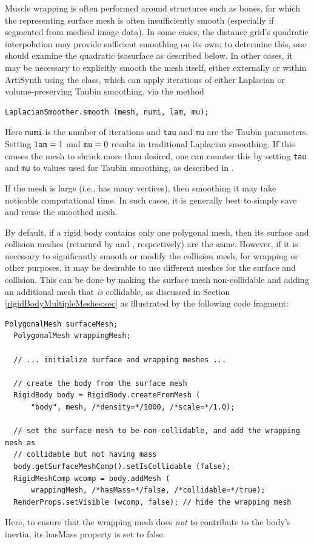 Muscle wrapping is often performed around structures such as bones,
for which the representing surface mesh is often insufficiently smooth
(especially if segmented from medical image data).  In some cases, the
distance grid's quadratic interpolation may provide sufficient
smoothing on its own; to determine this, one should examine the
quadratic isosurface as described below. In other cases, it may be
necessary to explicitly smooth the mesh itself, either externally or
within ArtiSynth using the  class,
which can apply iterations of either Laplacian or volume-preserving
Taubin smoothing, via the method
%
\begin{lstlisting}[]
  LaplacianSmoother.smooth (mesh, numi, lam, mu);
\end{lstlisting}
%
Here {\tt numi} is the number of iterations and {\tt tau} and {\tt mu}
are the Taubin parameters. Setting ${\tt lam} = 1$ and ${\tt mu} = 0$
results in traditional Laplacian smoothing. If this causes the mesh to
shrink more than desired, one can counter this by setting {\tt tau}
and {\tt mu} to values used for Taubin smoothing, as described in
\cite{taubin1995curve}.

\begin{sideblock}
If the mesh is large (i.e., has many vertices), then smoothing it may
take noticable computational time. In such cases, it is generally best
to simply save and reuse the smoothed mesh.
\end{sideblock}

By default, if a rigid body contains only one polygonal mesh, then its
surface and collision meshes (returned by
 and
, respectively) are
the same.  However, if it is necessary to significantly smooth or
modify the collision mesh, for wrapping or other purposes, it may be
desirable to use different meshes for the surface and collision. This
can be done by making the surface mesh non-collidable and adding an
additional mesh that {\it is} collidable, as discussed in Section
\ref{rigidBodyMultipleMeshes:sec} as illustrated by the following code
fragment:
%
\begin{lstlisting}[]
  PolygonalMesh surfaceMesh;
  PolygonalMesh wrappingMesh;

  // ... initialize surface and wrapping meshes ...

  // create the body from the surface mesh
  RigidBody body = RigidBody.createFromMesh (
      "body", mesh, /*density=*/1000, /*scale=*/1.0);

  // set the surface mesh to be non-collidable, and add the wrapping mesh as
  // collidable but not having mass
  body.getSurfaceMeshComp().setIsCollidable (false);
  RigidMeshComp wcomp = body.addMesh (
      wrappingMesh, /*hasMass=*/false, /*collidable=*/true);
  RenderProps.setVisible (wcomp, false); // hide the wrapping mesh
\end{lstlisting}
%
Here, to ensure that the wrapping mesh does {\it not} to contribute to
the body's inertia, its {\sf hasMass} property is set to false.

